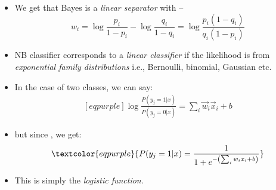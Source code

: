 \documentclass[
	number={3},
	title={Na\"iive Bayes Learning}
]{cs584notes}
\begin{document}
\begin{itemize}
	\item We get that \Naive Bayes is a \emph{linear separator} with --
	\begin{equation}[eqpurple]
		w_{i} = \log\frac{p_{i}}{1 - p_{i}} - \log\frac{q_{i}}{1 - q_{i}} = \log\frac{p_{i}(1-q_{i})}{q_{i}(1-p_{i})}
		\label{eq:naive-bayes-separator}
	\end{equation}
	\item NB classifier corresponds to a \emph{linear classifier} if the likelihood is from \emph{exponential family distributions} i.e., Bernoulli, binomial, Gaussian etc.
	\item In the case of two classes, we can say:
	\begin{equation*}
	\begin{aligned}[eqpurple]
		\log \frac{P(y_{j} = 1 | x)}{P(y_{j} = 0 | x)} = \sum_{i}\vec{w}_{i}\vec{x}_{i} + b
	\end{aligned}
	\end{equation*}
	\item but since , we get:
	\[ \textcolor{eqpurple}{ P(y_{j}=1|x) = \frac{1}{1+e^{-\left( \sum_{i}w_{i}x_{i} + b \right)}} } \]
	\item This is simply the \emph{logistic function}.
\end{itemize}
\end{document}
